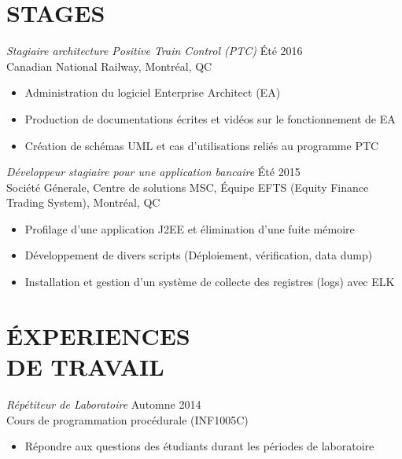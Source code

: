 \documentclass[margin, 10pt]{res} %
\begin{document}
\begin{resume}
 
\section{ STAGES}

{\sl Stagiaire architecture Positive Train Control (PTC)} \hfill \'Et\'e 2016 \\
Canadian National Railway, Montr\'eal, QC
\begin{itemize} \itemsep -2pt %
\item Administration du logiciel Enterprise Architect (EA)
\item Production de documentations \'ecrites et vid\'eos sur le fonctionnement de EA
\item Cr\'eation de sch\'emas UML et cas d'utilisations reli\'es au programme PTC
\end{itemize}

{\sl D\'eveloppeur stagiaire pour une application bancaire} \hfill \'Et\'e 2015 \\
Soci\'et\' e G\'enerale, Centre de solutions MSC, \'Equipe EFTS (Equity Finance Trading System), Montr\'eal, QC
\begin{itemize} \itemsep -2pt %
\item Profilage d'une application J2EE et \'elimination d'une fuite m\'emoire
\item  D\'eveloppement de divers scripts (D\'eploiement, v\'erification, data dump)
\item  Installation et gestion d'un syst\`eme de collecte des registres (logs) avec ELK
\end{itemize}
 
 
\section{\'EXPERIENCES \\ DE TRAVAIL}

{\sl R\'ep\'etiteur de Laboratoire} \hfill Automne 2014 \\
Cours de programmation proc\'edurale (INF1005C)
\begin{itemize} \itemsep -2pt %
\item R\'epondre aux questions des \'etudiants durant les p\'eriodes de laboratoire
\end{itemize}


\end{resume}
\end{document}

